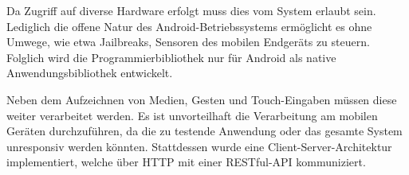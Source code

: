 Da Zugriff auf diverse Hardware erfolgt muss dies vom System erlaubt sein. Lediglich die offene Natur des Android-Betriebssystems ermöglicht es ohne Umwege, wie etwa Jailbreaks, Sensoren des mobilen Endgeräts zu steuern. Folglich wird die Programmierbibliothek nur für Android als native Anwendungsbibliothek entwickelt. 

Neben dem Aufzeichnen von Medien, Gesten und Touch-Eingaben müssen diese weiter verarbeitet werden. Es ist unvorteilhaft die Verarbeitung am mobilen Geräten durchzuführen, da die zu testende Anwendung oder das gesamte System unresponsiv werden könnten. Stattdessen wurde eine Client-Server-Architektur implementiert, welche über HTTP mit einer RESTful-API kommuniziert. 

